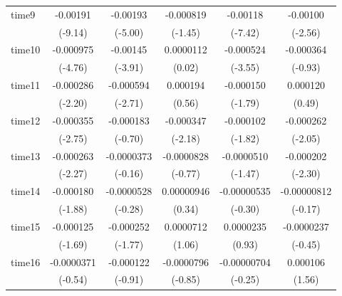 \begin{table}[htbp]
\begin{tabular}{l*{5}{c}}
time9       &    -0.00191\sym{***}&    -0.00193\sym{***}&   -0.000819         &    -0.00118\sym{***}&    -0.00100\sym{*}  \\
            &     (-9.14)         &     (-5.00)         &     (-1.45)         &     (-7.42)         &     (-2.56)         \\
time10      &   -0.000975\sym{***}&    -0.00145\sym{***}&   0.0000112         &   -0.000524\sym{***}&   -0.000364         \\
            &     (-4.76)         &     (-3.91)         &      (0.02)         &     (-3.55)         &     (-0.93)         \\
time11      &   -0.000286\sym{*}  &   -0.000594\sym{**} &    0.000194         &   -0.000150         &    0.000120         \\
            &     (-2.20)         &     (-2.71)         &      (0.56)         &     (-1.79)         &      (0.49)         \\
time12      &   -0.000355\sym{**} &   -0.000183         &   -0.000347\sym{*}  &   -0.000102         &   -0.000262\sym{*}  \\
            &     (-2.75)         &     (-0.70)         &     (-2.18)         &     (-1.82)         &     (-2.05)         \\
time13      &   -0.000263\sym{*}  &  -0.0000373         &  -0.0000828         &  -0.0000510         &   -0.000202\sym{*}  \\
            &     (-2.27)         &     (-0.16)         &     (-0.77)         &     (-1.47)         &     (-2.30)         \\
time14      &   -0.000180         &  -0.0000528         &  0.00000946         & -0.00000535         & -0.00000812         \\
            &     (-1.88)         &     (-0.28)         &      (0.34)         &     (-0.30)         &     (-0.17)         \\
time15      &   -0.000125         &   -0.000252         &   0.0000712         &   0.0000235         &  -0.0000237         \\
            &     (-1.69)         &     (-1.77)         &      (1.06)         &      (0.93)         &     (-0.45)         \\
time16      &  -0.0000371         &   -0.000122         &  -0.0000796         & -0.00000704         &    0.000106         \\
            &     (-0.54)         &     (-0.91)         &     (-0.85)         &     (-0.25)         &      (1.56)         \\

\end{tabular}
\end{table}
